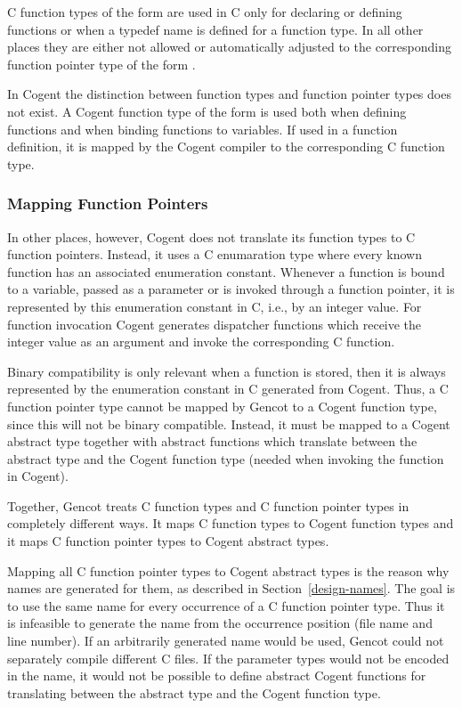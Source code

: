 C function types of the form  are used in C only for declaring or defining functions or
when a typedef name is defined for a function type. In all other
places they are either not allowed or automatically adjusted to the corresponding function pointer type
of the form . 

In Cogent the distinction between function types and function pointer types does not exist. 
A Cogent function type of the form  is used both when
defining functions and when binding functions to variables. If used in a function definition, it is mapped by
the Cogent compiler to the corresponding C function type.

\subsubsection{Mapping Function Pointers}

In other places, however, Cogent does not translate its function types to C function pointers. Instead, it uses 
a C enumaration type where 
every known function has an associated enumeration constant. Whenever a function is bound to a variable, passed 
as a parameter or is invoked through a function pointer, it is represented by this enumeration constant in C, i.e., by an integer value.
For function invocation Cogent generates dispatcher functions which receive the integer value as an argument
and invoke the corresponding C function. 

Binary compatibility is only relevant when a function is stored, then it is always represented by the enumeration
constant in C generated from Cogent. Thus, a C function pointer type cannot be 
mapped by Gencot to a Cogent function type,
since this will not be binary compatible. Instead, it must be mapped to a Cogent abstract type together with 
abstract functions which translate between the abstract type and the Cogent function type (needed when invoking 
the function in Cogent).

Together, Gencot treats C function types and C function pointer types in completely different ways. It maps
C function types to Cogent function types and it maps C function pointer types to Cogent abstract types.

Mapping all C function pointer types to Cogent abstract types is the reason why names are generated for them, as
described in Section~\ref{design-names}. The goal is to use the same name for every occurrence of a C 
function pointer type. Thus it is infeasible to generate the name from 
the occurrence position (file name and line number). If an arbitrarily generated name would be used, 
Gencot could not separately compile different C files. If the parameter types would not be encoded in
the name, it would not be possible to define abstract Cogent functions for translating between the
abstract type and the Cogent function type.

